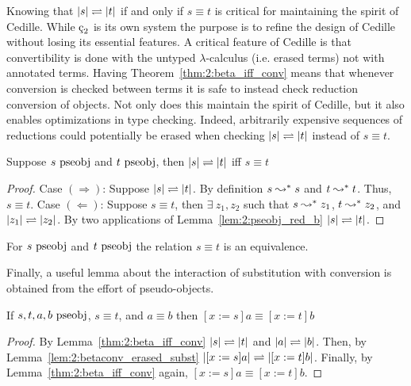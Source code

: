 Knowing that $|s| \rightleftharpoons |t|$ if and only if $s \equiv t$ is critical for maintaining the spirit of Cedille.
While $\ced$ is its own system the purpose is to refine the design of Cedille without losing its essential features.
A critical feature of Cedille is that convertibility is done with the untyped $\lambda$-calculus (i.e. erased terms) not with annotated terms.
Having Theorem~\ref{thm:2:beta_iff_conv} means that whenever conversion is checked between terms it is safe to instead check reduction conversion of objects.
Not only does this maintain the spirit of Cedille, but it also enables optimizations in type checking.
Indeed, arbitrarily expensive sequences of reductions could potentially be erased when checking $|s| \rightleftharpoons |t|$ instead of $s \equiv t$.

\begin{theorem}
    Suppose $s~\textnormal{pseobj}$ and $t~\textnormal{pseobj}$, then $|s| \rightleftharpoons |t|$ iff $s \equiv t$
    \label{thm:2:beta_iff_conv}
\end{theorem}
\begin{proof}
    Case $(\Rightarrow)$:
    Suppose $|s| \rightleftharpoons |t|$.
    By definition $s \leadsto^* s$ and $t \leadsto^* t$.
    Thus, $s \equiv t$.
    Case $(\Leftarrow)$:
    Suppose $s \equiv t$, then $\exists\ z_1, z_2$ such that $s \leadsto^* z_1$, $t \leadsto^* z_2$, and $|z_1| \rightleftharpoons |z_2|$.
    By two applications of Lemma~\ref{lem:2:pseobj_red_b} $|s| \rightleftharpoons |t|$.
\end{proof}

\begin{corollary}
    For $s~\textnormal{pseobj}$ and $t~\textnormal{pseobj}$ the relation $s \equiv t$ is an equivalence.
\end{corollary}

Finally, a useful lemma about the interaction of substitution with conversion is obtained from the effort of pseudo-objects.

\begin{lemma}
    If $s, t, a, b~\textnormal{pseobj}$, $s \equiv t$, and $a \equiv b$ then $[x := s]a \equiv [x := t]b$
    \label{lem:2:conv_subst}
\end{lemma}
\begin{proof}
    By Lemma~\ref{thm:2:beta_iff_conv} $|s| \rightleftharpoons |t|$ and $|a| \rightleftharpoons |b|$.
    Then, by Lemma~\ref{lem:2:betaconv_erased_subst} $|[x := s]a| \rightleftharpoons |[x := t]b|$.
    Finally, by Lemma~\ref{thm:2:beta_iff_conv} again, $[x := s]a \equiv [x := t]b$.
\end{proof}

